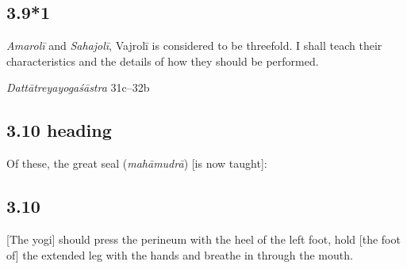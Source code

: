 \begin{ekdosis}

\subsection*{3.9*1}
\begin{translation}[hp03_009_1]
[With] \emph{Amarolī} and \emph{Sahajolī}, Vajrolī is considered to be threefold. I shall teach their characteristics and the details of how they should be performed.
\end{translation}

\begin{sources}[hp03_009_1]
\emph{Dattātreyayogaśāstra} 31c–32b
\begin{versinnote}
\tl{\var{vajrolī ] vajrolir \vl • cāmarolī ] amaroliś \vl • sahajolī ] sahajolis \vl}\\!}
\end{versinnote}
\end{sources}



\subsection*{3.10 heading}
\begin{translation}[hp03_010a]
Of these, the great seal (\emph{mahāmudrā}) [is now taught]: 
\end{translation}


\subsection*{3.10}
\begin{translation}[hp03_010]
{}[The yogi] should press the perineum with the heel of the left foot, hold [the foot of] the extended leg with the hands and breathe in through the mouth.
\end{translation}


\end{ekdosis}
